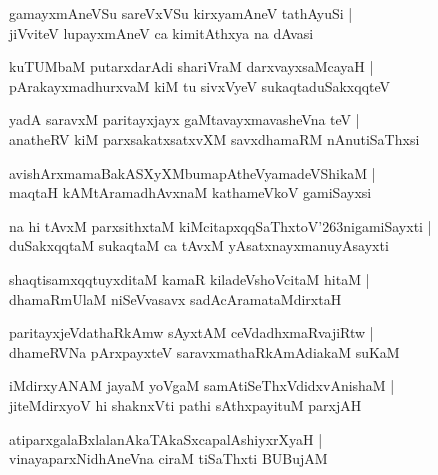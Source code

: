 \documentclass[twoside,12pt,openright]{book}
\def\S{\char'263}
\newcounter{shloka}[chapter]
\begin{document}
\begin{shloka}%
gamayxmAneVSu sareVxVSu kirxyamAneV tathAyuSi |\\
jiVviteV lupayxmAneV ca kimitAthxya na dAvasi
\end{shloka}

\begin{shloka}%
kuTUMbaM putarxdarAdi shariVraM darxvayxsaMcayaH |\\
pArakayxmadhurxvaM kiM tu sivxVyeV sukaqtaduSakxqqteV 
\end{shloka}

\begin{shloka}%
yadA saravxM paritayxjayx gaMtavayxmavasheVna teV |\\
anatheRV kiM parxsakatxsatxvXM savxdhamaRM nAnutiSaThxsi 
\end{shloka}

\begin{shloka}%
avishArxmamaBakASXyXMbumapAtheVyamadeVShikaM |\\
maqtaH kAMtAramadhAvxnaM kathameVkoV gamiSayxsi 
\end{shloka}

\begin{shloka}%
na hi tAvxM parxsithxtaM kiMcitapxqqSaThxtoV\S nigamiSayxti |\\
duSakxqqtaM sukaqtaM ca tAvxM yAsatxnayxmanuyAsayxti 
\end{shloka}

\begin{shloka}%
shaqtisamxqqtuyxditaM kamaR kiladeVshoVcitaM hitaM |\\
dhamaRmUlaM niSeVvasavx sadAcAramataMdirxtaH 
\end{shloka}

\begin{shloka}%
paritayxjeVdathaRkAmw sAyxtAM ceVdadhxmaRvajiRtw |\\
dhameRVNa pArxpayxteV saravxmathaRkAmAdiakaM suKaM 
\end{shloka}

\begin{shloka}%
iMdirxyANAM jayaM yoVgaM samAtiSeThxVdidxvAnishaM |\\
jiteMdirxyoV hi shaknxVti pathi sAthxpayituM parxjAH 
\end{shloka}

\begin{shloka}%
atiparxgalaBxlalanAkaTAkaSxcapalAshiyxrXyaH |\\
vinayaparxNidhAneVna ciraM tiSaThxti BUBujAM 
\end{shloka}
\end{document}
